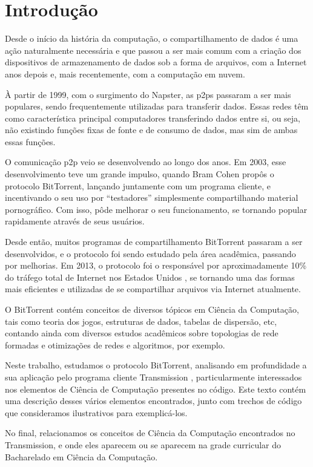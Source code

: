 
\chapter{Introdução}

Desde o início da história da computação, o compartilhamento de dados é uma ação
naturalmente necessária e que passou a ser mais comum com a criação dos dispositivos de
armazenamento de dados sob a forma de arquivos, com a Internet anos depois e, mais
recentemente, com a computação em nuvem.

À partir de 1999, com o surgimento do Napster, as \glspl{p2p} passaram a ser mais
populares, sendo frequentemente utilizadas para transferir dados. Essas redes têm como
característica principal computadores transferindo dados entre si, ou seja, não
existindo funções fixas de fonte e de consumo de dados, mas sim de ambas essas funções.

O comunicação \gls*{p2p} veio se desenvolvendo ao longo dos anos. Em 2003, esse
desenvolvimento teve um grande impulso, quando Bram Cohen propôs o protocolo BitTorrent,
lançando juntamente com um programa cliente, e incentivando o seu uso por ``testadores''
simplesmente compartilhando material pornográfico. Com isso, pôde melhorar o seu
funcionamento, se tornando popular rapidamente através de seus usuários.

Desde então, muitos programas de compartilhamento BitTorrent passaram a ser
desenvolvidos, e o protocolo foi sendo estudado pela área acadêmica, passando por
melhorias. Em 2013, o protocolo foi o responsável por aproximadamente 10\% do tráfego
total de Internet nos Estados Unidos \cite{report:internet-usage-2013}, se tornando uma
das formas mais eficientes e utilizadas de se compartilhar arquivos via Internet
atualmente.

O BitTorrent contém conceitos de diversos tópicos em Ciência da Computação, tais como
teoria dos jogos, estruturas de dados, tabelas de dispersão, etc, contando ainda com
diversos estudos acadêmicos sobre topologias de rede formadas e otimizações de redes e
algoritmos, por exemplo.

Neste trabalho, estudamos o protocolo BitTorrent, analisando em profundidade a sua
aplicação pelo programa cliente Transmission \cite{site:transmission}, particularmente
interessados nos elementos de Ciência de Computação presentes no código. Este texto
contém uma descrição desses vários elementos encontrados, junto com trechos de código
que consideramos ilustrativos para exemplicá-los.

No final, relacionamos os conceitos de Ciência da Computação encontrados no
Transmission, e onde eles aparecem ou se aparecem na grade curricular do Bacharelado em
Ciência da Computação.

\afterpage{\clearpage}